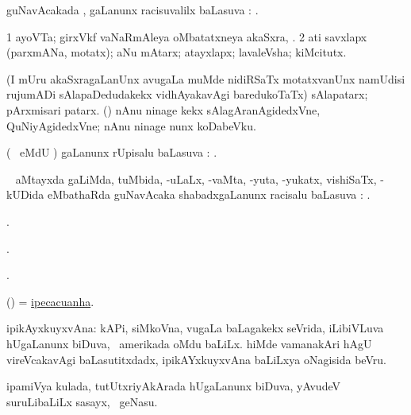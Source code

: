 \bentry
{}
\gl{\uparx}
\bmng
guNavAcakada \tara, \tama gaLanunx racisuvalilx baLasuva \uparx: . 
\emng
\eentry

\bentry
{}
\gl{\nA}
\bmng
\bnum
\num{1} ayoVTa; girxVkf vaNaRmAleya oMbatatxneya akaSxra, . 
\num{2} ati savxlapx (parxmANa, motatx); aNu mAtarx; atayxlapx; lavaleVsha; kiMcitutx. 
\enum
\emng
\eentry

\bentry
{}
\gl{\nA}
\bmng
(I mUru akaSxragaLanUnx avugaLa muMde nidiRSaTx motatxvanUnx namUdisi rujumADi sAlapaDedudakekx vidhAyakavAgi baredukoTaTx) sAlapatarx; pArxmisari patarx. () nAnu ninage \eng{$\ldots$}kekx sAlagAranAgidedxVne, QuNiyAgidedxVne; nAnu ninage \eng{$\ldots$}nunx koDabeVku. 
\emng
\eentry

\bentry
{}
\gl{\uparx}
\bmng
(\ame\  eMdU \parx) \nA gaLanunx rUpisalu baLasuva \uparx: . 
\emng
\eentry

\bentry
{}
\gl{\uparx}
\bmng
\kanmu\  aMtayxda \nA gaLiMda, tuMbida, -uLaLx, -vaMta, -yuta, -yukatx, vishiSaTx, -kUDida eMbathaRda guNavAcaka shabadxgaLanunx racisalu baLasuva \uparx: . 
\emng
\eentry

\bentry
{}
\gl{\saMkiSx}
\bmng
{}. 
\emng
\eentry

\bentry
{}
\gl{\saMkiSx}
\bmng
{}. 
\emng
\eentry

\bentry
{}
\gl{\saMkiSx}
\bmng
{}. 
\emng
\eentry

\bentry
{}
\gl{\nA}
\bmng
(\AmA) = \hyperlink{ipecacuanha}{ipecacuanha}. 
\emng
\eentry

\bentry
{}
\gl{\nA}
\bmng
ipikAyxkuyxvAna: 
\banum
{} kAPi, siMkoVna, \mo vugaLa baLagakekx seVrida, iLibiVLuva hUgaLanunx biDuva, \da\ amerikada oMdu baLiLx. 
 hiMde vamanakAri hAgU vireVcakavAgi baLasutitxdadx, ipikAYxkuyxvAna baLiLxya oNagisida beVru. 
\eanum
\emng
\eentry

\bentry
{}
\gl{\nA}
\bmng
ipamiVya kulada, tutUtxriyAkArada hUgaLanunx biDuva, yAvudeV suruLibaLiLx sasayx, \udA\ geNasu. 
\emng
\eentry

